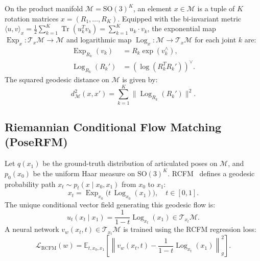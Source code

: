 \documentclass[10pt,twocolumn,letterpaper]{article}
\DeclareMathOperator{\Exp}{Exp}
\DeclareMathOperator{\Log}{Log}
\DeclareMathOperator{\Tr}{Tr}
\begin{document}
On the product manifold $\mathcal{M} = \mathrm{SO}(3)^K$, an element $x \in \mathcal{M}$ is a tuple of $K$ rotation matrices $x = (R_1, \dots, R_K)$. Equipped with the bi-invariant metric $\langle u, v \rangle_x = \frac{1}{2}\sum_{k=1}^K \Tr(u_k^T v_k) = \sum_{k=1}^K u_k \cdot v_k$, the exponential map $\Exp_x : \mathcal{T}_x \mathcal{M} \to \mathcal{M}$ and logarithmic map $\Log_x : \mathcal{M} \to \mathcal{T}_x \mathcal{M}$ for each joint $k$ are:
\begin{align}
\Exp_{R_k}(v_k) &= R_k \exp(v_k^\wedge), \\
\Log_{R_k}(R_k') &= \left( \log(R_k^T R_k') \right)^\vee.
\end{align}
The squared geodesic distance on $\mathcal{M}$ is given by:
\begin{equation}
d_{\mathcal{M}}^2(x, x') = \sum_{k=1}^K \|\Log_{R_k}(R_k')\|^2.
\end{equation}

\subsection{Riemannian Conditional Flow Matching (PoseRFM)}
Let $q(x_1)$ be the ground-truth distribution of articulated poses on $\mathcal{M}$, and $p_0(x_0)$ be the uniform Haar measure on $\mathrm{SO}(3)^K$. RCFM~\cite{chen2023riemannian,nadar2026posedflow} defines a geodesic probability path $x_t \sim p_t(x \mid x_0, x_1)$ from $x_0$ to $x_1$:
\begin{equation}
x_t = \Exp_{x_0}\big( t \, \Log_{x_0}(x_1) \big), \quad t \in [0, 1].
\end{equation}
The unique conditional vector field generating this geodesic flow is:
\begin{equation}
u_t(x_t \mid x_1) = \frac{1}{1 - t} \Log_{x_t}(x_1) \in \mathcal{T}_{x_t}\mathcal{M}.
\end{equation}
A neural network $v_w(x_t, t) \in \mathcal{T}_{x_t}\mathcal{M}$ is trained using the RCFM regression loss:
\begin{equation}
\mathcal{L}_{\mathrm{RCFM}}(w) = \mathbb{E}_{t, x_0, x_1} \left[ \left\| v_w(x_t, t) - \frac{1}{1-t}\Log_{x_t}(x_1) \right\|_g^2 \right].
\end{equation}
\end{document}
